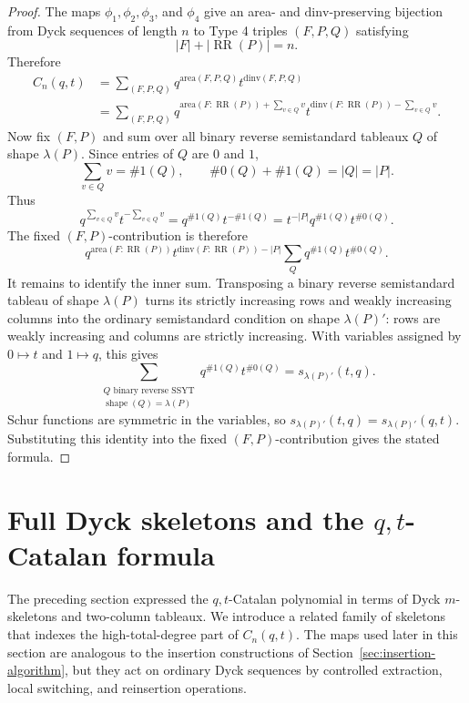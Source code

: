 \documentclass[11pt]{article}
\theoremstyle{plain}
\theoremstyle{definition}
\theoremstyle{remark}
\newcommand{\dinv}{\mathrm{dinv}}
\newcommand{\area}{\mathrm{area}}
\begin{document}
\begin{proof}
The maps \(\phi_1,\phi_2,\phi_3\), and \(\phi_4\) give an area- and
\(\dinv\)-preserving bijection from Dyck sequences of length \(n\) to Type 4
triples \((F,P,Q)\) satisfying
\[
  |F|+|\operatorname{RR}(P)|=n.
\]
Therefore
\[
\begin{aligned}
  C_n(q,t)
  &=\sum_{(F,P,Q)}
    q^{\area(F,P,Q)}t^{\dinv(F,P,Q)}\\
  &=\sum_{(F,P,Q)}
    q^{\area(F:\operatorname{RR}(P))+\sum_{v\in Q}v}
    t^{\dinv(F:\operatorname{RR}(P))-\sum_{v\in Q}v}.
\end{aligned}
\]
Now fix \((F,P)\) and sum over all binary reverse semistandard tableaux \(Q\)
of shape \(\lambda(P)\).  Since entries of \(Q\) are \(0\) and \(1\),
\[
  \sum_{v\in Q}v=\#1(Q),
  \qquad
  \#0(Q)+\#1(Q)=|Q|=|P|.
\]
Thus
\[
  q^{\sum_{v\in Q}v}t^{-\sum_{v\in Q}v}
  =q^{\#1(Q)}t^{-\#1(Q)}
  =t^{-|P|}q^{\#1(Q)}t^{\#0(Q)}.
\]
The fixed \((F,P)\)-contribution is therefore
\[
  q^{\area(F:\operatorname{RR}(P))}
  t^{\dinv(F:\operatorname{RR}(P))-|P|}
  \sum_Q q^{\#1(Q)}t^{\#0(Q)}.
\]
It remains to identify the inner sum.  Transposing a binary reverse
semistandard tableau of shape \(\lambda(P)\) turns its strictly increasing rows
and weakly increasing columns into the ordinary semistandard condition on shape
\(\lambda(P)'\): rows are weakly increasing and columns are strictly
increasing.  With variables assigned by \(0\mapsto t\) and \(1\mapsto q\), this
gives
\[
  \sum_{\substack{Q\text{ binary reverse SSYT}\\
                  \operatorname{shape}(Q)=\lambda(P)}}
  q^{\#1(Q)}t^{\#0(Q)}
  =s_{\lambda(P)'}(t,q).
\]
Schur functions are symmetric in the variables, so
\(s_{\lambda(P)'}(t,q)=s_{\lambda(P)'}(q,t)\).  Substituting this identity into
the fixed \((F,P)\)-contribution gives the stated formula.
\end{proof}


\section{\texorpdfstring{Full Dyck skeletons and the \(q,t\)-Catalan formula}{Full Dyck skeletons and the q,t-Catalan formula}}
\label{sec:full-skeletons}

The preceding section expressed the \(q,t\)-Catalan polynomial in terms of
Dyck \(m\)-skeletons and two-column tableaux.  We introduce a related
family of skeletons that indexes the high-total-degree part of
\(C_n(q,t)\).  The maps used later in this section are analogous to the
insertion constructions of Section~\ref{sec:insertion-algorithm}, but they act on
ordinary Dyck sequences by controlled extraction, local switching, and
reinsertion operations.
\end{document}
